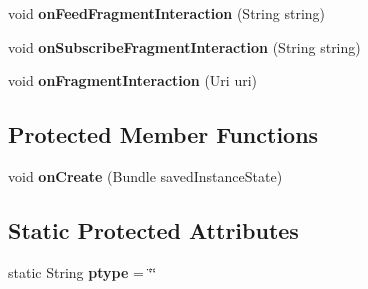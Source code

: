 \begin{DoxyCompactItemize}
\item 
\hypertarget{classcom_1_1example_1_1sel_1_1lostfound_1_1FeedActivity_a387420f45593f43ed8a998fabd4e1840}{void {\bfseries on\-Feed\-Fragment\-Interaction} (\-String string)}\label{classcom_1_1example_1_1sel_1_1lostfound_1_1FeedActivity_a387420f45593f43ed8a998fabd4e1840}

\item 
\hypertarget{classcom_1_1example_1_1sel_1_1lostfound_1_1FeedActivity_a2933085fa5342bd11b601c37120d850e}{void {\bfseries on\-Subscribe\-Fragment\-Interaction} (\-String string)}\label{classcom_1_1example_1_1sel_1_1lostfound_1_1FeedActivity_a2933085fa5342bd11b601c37120d850e}

\item 
\hypertarget{classcom_1_1example_1_1sel_1_1lostfound_1_1FeedActivity_a15280442a0b2314b06299d1d57318827}{void {\bfseries on\-Fragment\-Interaction} (\-Uri uri)}\label{classcom_1_1example_1_1sel_1_1lostfound_1_1FeedActivity_a15280442a0b2314b06299d1d57318827}

\end{DoxyCompactItemize}
\subsection*{\-Protected \-Member \-Functions}
\begin{DoxyCompactItemize}
\item 
\hypertarget{classcom_1_1example_1_1sel_1_1lostfound_1_1FeedActivity_a27dee5594c91dcb9216364c9556c4af7}{void {\bfseries on\-Create} (\-Bundle saved\-Instance\-State)}\label{classcom_1_1example_1_1sel_1_1lostfound_1_1FeedActivity_a27dee5594c91dcb9216364c9556c4af7}

\end{DoxyCompactItemize}
\subsection*{\-Static \-Protected \-Attributes}
\begin{DoxyCompactItemize}
\item 
\hypertarget{classcom_1_1example_1_1sel_1_1lostfound_1_1FeedActivity_a485e807a263274d664ce60fae23ebb45}{static \-String {\bfseries ptype} = \char`\"{}\char`\"{}}\label{classcom_1_1example_1_1sel_1_1lostfound_1_1FeedActivity_a485e807a263274d664ce60fae23ebb45}

\end{DoxyCompactItemize}

